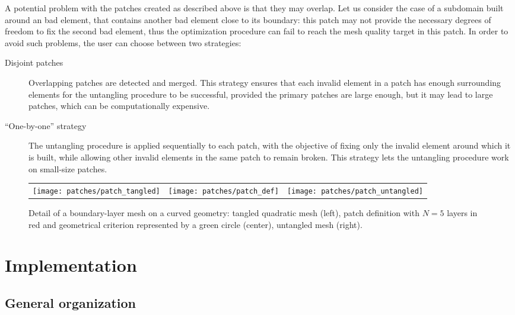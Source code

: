 \documentclass[12pt,a4paper,a4wide]{article}
\begin{document}
A potential problem with the patches created as described above is
that they may overlap. Let us consider the case of a subdomain built
around an bad element, that contains another bad element close to its
boundary: this patch may not provide the necessary degrees of freedom
to fix the second bad element, thus the optimization procedure can
fail to reach the mesh quality target in this patch.
In order to avoid such problems, the user can choose between two
strategies:
\begin{description}
\item[Disjoint patches] Overlapping patches are detected and
merged. This strategy ensures that each invalid element in a patch
has enough surrounding elements for the untangling procedure to
be successful, provided the primary patches are large enough, but
it may lead to large patches, which can be computationally expensive.
\item[``One-by-one'' strategy] The untangling procedure is applied
sequentially to each patch, with the objective of fixing only
the invalid element around which it is built, while allowing other
invalid elements in the same patch to remain broken. This strategy
lets the untangling procedure work on small-size patches.
\end{description}

\begin{figure}
\begin{center}
\begin{tabular}{ccc}
\texttt{[image: patches/patch\_tangled]}&
\texttt{[image: patches/patch\_def]}&
\texttt{[image: patches/patch\_untangled]}
\end{tabular}
\end{center}
\caption{Detail of a boundary-layer mesh on a curved geometry:
tangled quadratic mesh (left), patch definition with $N=5$ layers
in red and geometrical criterion represented by a green circle
(center), untangled mesh (right).
\label{fig:patches}}
\end{figure}


\section{Implementation}


\subsection{General organization}\label{sec:gen-org}
\end{document}

